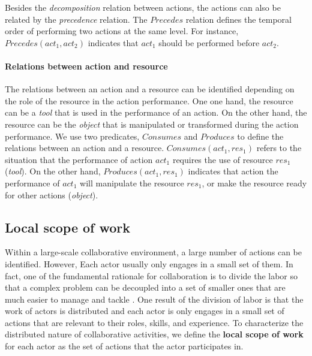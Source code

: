 Besides the \emph{decomposition} relation between actions, the actions can also be related by the \emph{precedence} relation. The $Precedes$ relation defines the temporal order of performing two actions at the same level. For instance, $Precedes(act_1, act_2)$ indicates that $act_1$ should be performed before $act_2$. 

\paragraph*{Relations between action and resource} %
\label{par:relations_between_action_and_resource}
The relations between an action and a resource can be identified depending on the role of the resource in the action performance. One one hand, the resource can be a \emph{tool} that is used in the performance of an action. On the other hand, the resource can be the \emph{object} that is manipulated or transformed during the action performance. We use two predicates, $Consumes$ and $Produces$ to define the relations between an action and a resource. $Consumes(act_1, res_1)$ refers to the situation that the performance of action $act_1$ requires the use of resource $res_1$  (\emph{tool}). On the other hand, $Produces(act_1, res_1)$ indicates that action the performance of $act_1$ will manipulate the resource $res_1$, or make the resource ready for other actions (\emph{object}).

\subsection{Local scope of work} %
\label{sub:local_scope_of_work}
Within a large-scale collaborative environment, a large number of actions can be identified. However, Each actor usually only engages in a small set of them. In fact, one of the fundamental rationale for collaboration is to divide the labor so that a complex problem can be decoupled into a set of smaller ones that are much easier to manage and tackle \cite{schmidt1992taking}. One result of the division of labor is that the work of actors is distributed and each actor is only engages in a small set of actions that are relevant to their roles, skills, and experience. To characterize the distributed nature of collaborative activities, we define the \textbf{local scope of work} for each actor as the set of actions that the actor participates in.

